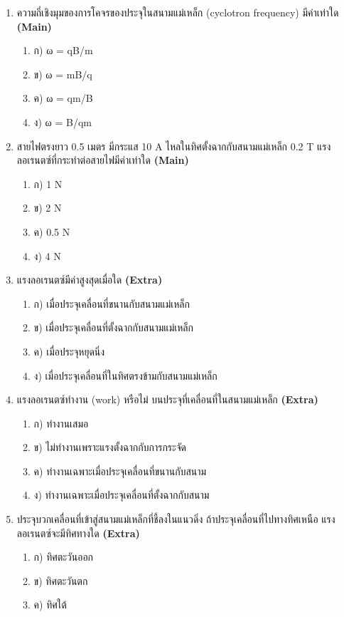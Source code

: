 \documentclass[12pt]{article}
\begin{document}
\begin{enumerate}[label=\arabic*.]
\item ความถี่เชิงมุมของการโคจรของประจุในสนามแม่เหล็ก (cyclotron frequency) มีค่าเท่าใด \hfill \textbf{\small (Main)}
\begin{enumerate}[label=)]
\item ก) ω = qB/m
\item ข) ω = mB/q
\item ค) ω = qm/B
\item ง) ω = B/qm
\end{enumerate}
\item สายไฟตรงยาว 0.5 เมตร มีกระแส 10 A ไหลในทิศตั้งฉากกับสนามแม่เหล็ก 0.2 T แรงลอเรนตซ์ที่กระทำต่อสายไฟมีค่าเท่าใด \hfill \textbf{\small (Main)}
\begin{enumerate}[label=)]
\item ก) 1 N
\item ข) 2 N
\item ค) 0.5 N
\item ง) 4 N
\end{enumerate}
\item แรงลอเรนตซ์มีค่าสูงสุดเมื่อใด \hfill \textbf{\small (Extra)}
\begin{enumerate}[label=)]
\item ก) เมื่อประจุเคลื่อนที่ขนานกับสนามแม่เหล็ก
\item ข) เมื่อประจุเคลื่อนที่ตั้งฉากกับสนามแม่เหล็ก
\item ค) เมื่อประจุหยุดนิ่ง
\item ง) เมื่อประจุเคลื่อนที่ในทิศตรงข้ามกับสนามแม่เหล็ก
\end{enumerate}
\item แรงลอเรนตซ์ทำงาน (work) หรือไม่ บนประจุที่เคลื่อนที่ในสนามแม่เหล็ก \hfill \textbf{\small (Extra)}
\begin{enumerate}[label=)]
\item ก) ทำงานเสมอ
\item ข) ไม่ทำงานเพราะแรงตั้งฉากกับการกระจัด
\item ค) ทำงานเฉพาะเมื่อประจุเคลื่อนที่ขนานกับสนาม
\item ง) ทำงานเฉพาะเมื่อประจุเคลื่อนที่ตั้งฉากกับสนาม
\end{enumerate}
\item ประจุบวกเคลื่อนที่เข้าสู่สนามแม่เหล็กที่ชี้ลงในแนวดิ่ง ถ้าประจุเคลื่อนที่ไปทางทิศเหนือ แรงลอเรนตซ์จะมีทิศทางใด \hfill \textbf{\small (Extra)}
\begin{enumerate}[label=)]
\item ก) ทิศตะวันออก
\item ข) ทิศตะวันตก
\item ค) ทิศใต้

\end{enumerate}
\end{enumerate}
\end{document}
